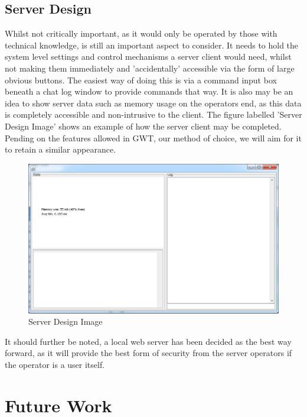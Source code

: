 \subsection{Server Design}
Whilst not critically important, as it would only be operated by those with 
technical knowledge, is still an important aspect to consider. It needs to hold 
the system level settings and control mechanisms a server client would need, 
whilst not making them immediately and 'accidentally' accessible via the form of 
large obvious buttons. The easiest way of doing this is via a command input box 
beneath a chat log window to provide commands that way. It is also may be an 
idea to show server data such as memory usage on the operators end, as this data 
is completely accessible and non-intrusive to the client. The figure labelled 
'Server Design Image' shows an example of how the server client may be completed.
Pending on the features allowed in GWT, our method of choice, we will aim for 
it to retain a similar appearance.   

\begin{figure}[H]
    \centering
    \includegraphics[width=\textwidth]{images/design/server.jpg}
    \caption{Server Design Image}
    \label{fig:server}
\end{figure}

It should further be noted, a local web server has been decided as the best way 
forward, as it will provide the best form of security from the server operators 
if the operator is a user itself.

\section{Future Work}


